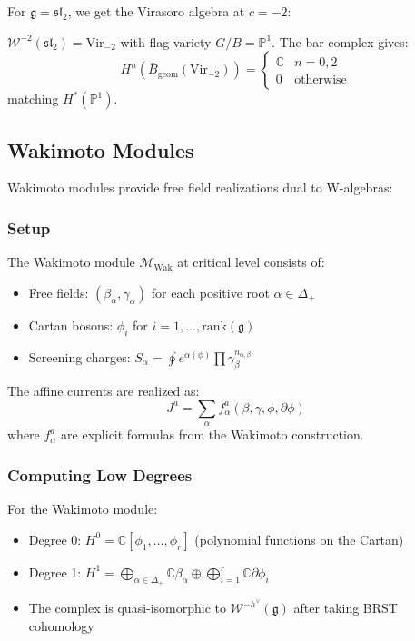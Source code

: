 For $\mathfrak{g} = \mathfrak{sl}_2$, we get the Virasoro algebra at $c = -2$:
 
\begin{proposition}
$\mathcal{W}^{-2}(\mathfrak{sl}_2) = \text{Vir}_{-2}$ with flag variety $G/B = \mathbb{P}^1$. The bar complex gives:
\[
H^n(\bar{B}_{\text{geom}}(\text{Vir}_{-2})) = 
\begin{cases}
\mathbb{C} & n = 0, 2 \\
0 & \text{otherwise}
\end{cases}
\]
matching $H^*(\mathbb{P}^1)$.
\end{proposition}
 
\subsection{Wakimoto Modules}
 
Wakimoto modules provide free field realizations dual to W-algebras:
 
\subsubsection{Setup}
 
\begin{definition}
The Wakimoto module $\mathcal{M}_{\text{Wak}}$ at critical level consists of:
\begin{itemize}
\item Free fields: $(\beta_\alpha, \gamma_\alpha)$ for each positive root $\alpha \in \Delta_+$
\item Cartan bosons: $\phi_i$ for $i = 1, \ldots, \text{rank}(\mathfrak{g})$
\item Screening charges: $S_\alpha = \oint e^{\alpha(\phi)} \prod \gamma_\beta^{n_{\alpha,\beta}}$
\end{itemize}
The affine currents are realized as:
\[
J^a = \sum_{\alpha} f^a_\alpha(\beta, \gamma, \phi, \partial\phi)
\]
where $f^a_\alpha$ are explicit formulas from the Wakimoto construction.
\end{definition}
 
\subsubsection{Computing Low Degrees}
 
\begin{theorem}
For the Wakimoto module:
\begin{itemize}
\item Degree 0: $H^0 = \mathbb{C}[\phi_1, \ldots, \phi_r]$ (polynomial functions on the Cartan)
\item Degree 1: $H^1 = \bigoplus_{\alpha \in \Delta_+} \mathbb{C}\beta_\alpha \oplus \bigoplus_{i=1}^r \mathbb{C}\partial\phi_i$
\item The complex is quasi-isomorphic to $\mathcal{W}^{-h^\vee}(\mathfrak{g})$ after taking BRST cohomology
\end{itemize}
\end{theorem}
 
